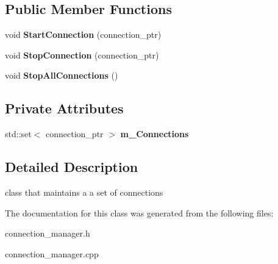\subsection*{\-Public \-Member \-Functions}
\begin{DoxyCompactItemize}
\item 
\hypertarget{classhttp__server_1_1cConnectionManager_ab7741005e29b740894addaded7a17ee2}{void {\bfseries \-Start\-Connection} (connection\-\_\-ptr)}\label{classhttp__server_1_1cConnectionManager_ab7741005e29b740894addaded7a17ee2}

\item 
\hypertarget{classhttp__server_1_1cConnectionManager_a740f1202cf4db1493aac3c8f0a99bbb4}{void {\bfseries \-Stop\-Connection} (connection\-\_\-ptr)}\label{classhttp__server_1_1cConnectionManager_a740f1202cf4db1493aac3c8f0a99bbb4}

\item 
\hypertarget{classhttp__server_1_1cConnectionManager_a5dddb041d33c7bbb4220deaa9dd74b3c}{void {\bfseries \-Stop\-All\-Connections} ()}\label{classhttp__server_1_1cConnectionManager_a5dddb041d33c7bbb4220deaa9dd74b3c}

\end{DoxyCompactItemize}
\subsection*{\-Private \-Attributes}
\begin{DoxyCompactItemize}
\item 
\hypertarget{classhttp__server_1_1cConnectionManager_a6bc3632311d979511b8393d611b88752}{std\-::set$<$ connection\-\_\-ptr $>$ {\bfseries m\-\_\-\-Connections}}\label{classhttp__server_1_1cConnectionManager_a6bc3632311d979511b8393d611b88752}

\end{DoxyCompactItemize}


\subsection{\-Detailed \-Description}
class that maintains a a set of connections 

\-The documentation for this class was generated from the following files\-:\begin{DoxyCompactItemize}
\item 
connection\-\_\-manager.\-h\item 
connection\-\_\-manager.\-cpp\end{DoxyCompactItemize}
